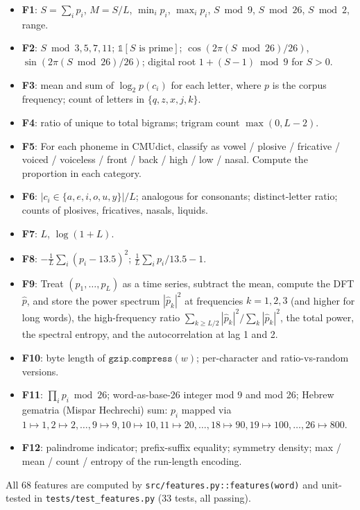 \documentclass{article}
\begin{document}
\begin{itemize}
\item \textbf{F1}: $S = \sum_i p_i$, $M = S/L$, $\min_i p_i$, $\max_i p_i$, $S \bmod 9$, $S \bmod 26$, $S \bmod 2$, range.
\item \textbf{F2}: $S \bmod 3, 5, 7, 11$; $\mathbb{1}[\text{$S$ is prime}]$; $\cos(2\pi (S \bmod 26)/26)$, $\sin(2\pi (S \bmod 26)/26)$; digital root $1 + (S-1) \bmod 9$ for $S > 0$.
\item \textbf{F3}: mean and sum of $\log_2 p(c_i)$ for each letter, where $p$ is the corpus frequency; count of letters in $\{q, z, x, j, k\}$.
\item \textbf{F4}: ratio of unique to total bigrams; trigram count $\max(0, L-2)$.
\item \textbf{F5}: For each phoneme in CMUdict, classify as vowel / plosive / fricative / voiced / voiceless / front / back / high / low / nasal. Compute the proportion in each category.
\item \textbf{F6}: $|c_i \in \{a,e,i,o,u,y\}| / L$; analogous for consonants; distinct-letter ratio; counts of plosives, fricatives, nasals, liquids.
\item \textbf{F7}: $L$, $\log(1+L)$.
\item \textbf{F8}: $-\frac{1}{L} \sum_i (p_i - 13.5)^2$; $\frac{1}{L} \sum_i p_i / 13.5 - 1$.
\item \textbf{F9}: Treat $(p_1, \ldots, p_L)$ as a time series, subtract the mean, compute the DFT $\hat{p}$, and store the power spectrum $|\hat{p}_k|^2$ at frequencies $k = 1, 2, 3$ (and higher for long words), the high-frequency ratio $\sum_{k \geq L/2} |\hat{p}_k|^2 / \sum_k |\hat{p}_k|^2$, the total power, the spectral entropy, and the autocorrelation at lag 1 and 2.
\item \textbf{F10}: byte length of $\texttt{gzip.compress}(w)$; per-character and ratio-vs-random versions.
\item \textbf{F11}: $\prod_i p_i \bmod 26$; word-as-base-26 integer mod 9 and mod 26; Hebrew gematria (Mispar Hechrechi) sum: $p_i$ mapped via $1 \mapsto 1, 2 \mapsto 2, \ldots, 9 \mapsto 9, 10 \mapsto 10, 11 \mapsto 20, \ldots, 18 \mapsto 90, 19 \mapsto 100, \ldots, 26 \mapsto 800$.
\item \textbf{F12}: palindrome indicator; prefix-suffix equality; symmetry density; max / mean / count / entropy of the run-length encoding.
\end{itemize}

All 68 features are computed by \texttt{src/features.py::features(word)} and unit-tested in \texttt{tests/test\_features.py} (33 tests, all passing).
\end{document}
